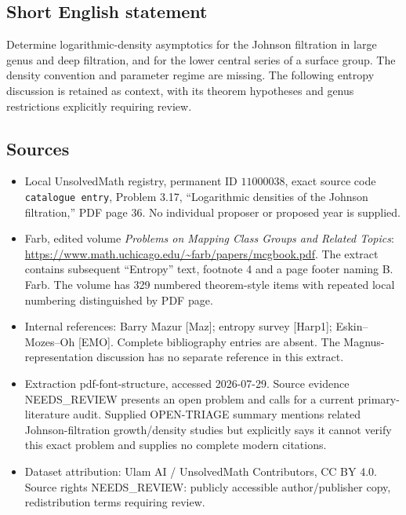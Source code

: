 \documentclass[11pt]{article}
\begin{document}
\subsection{Short English statement}
Determine logarithmic-density asymptotics for the Johnson filtration in large genus and deep filtration, and for the lower central series of a surface group. The density convention and parameter regime are missing. The following entropy discussion is retained as context, with its theorem hypotheses and genus restrictions explicitly requiring review.
\subsection{Sources}
\begin{itemize}
\item Local UnsolvedMath registry, permanent ID \(11000038\), exact source code \texttt{catalogue entry}, Problem 3.17, ``Logarithmic densities of the Johnson filtration,'' PDF page 36. No individual proposer or proposed year is supplied.
\item Farb, edited volume \emph{Problems on Mapping Class Groups and Related Topics}: \url{https://www.math.uchicago.edu/~farb/papers/mcgbook.pdf}. The extract contains subsequent ``Entropy'' text, footnote 4 and a page footer naming B. Farb. The volume has 329 numbered theorem-style items with repeated local numbering distinguished by PDF page.
\item Internal references: Barry Mazur [Maz]; entropy survey [Harp1]; Eskin--Mozes--Oh [EMO]. Complete bibliography entries are absent. The Magnus-representation discussion has no separate reference in this extract.
\item Extraction pdf-font-structure, accessed 2026-07-29. Source evidence NEEDS\_REVIEW presents an open problem and calls for a current primary-literature audit. Supplied OPEN-TRIAGE summary mentions related Johnson-filtration growth/density studies but explicitly says it cannot verify this exact problem and supplies no complete modern citations.
\item Dataset attribution: Ulam AI / UnsolvedMath Contributors, CC BY 4.0. Source rights NEEDS\_REVIEW: publicly accessible author/publisher copy, redistribution terms requiring review.
\end{itemize}
\end{document}
